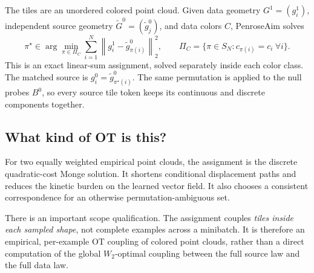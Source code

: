\documentclass[11pt]{article}
\newcommand{\1}{\mathbf{1}}
\begin{document}
The tiles are an unordered colored point cloud.  Given data geometry
\(G^1=(g_i^1)\), independent source geometry \(\widetilde G^0=(\tilde g_j^0)\),
and data colors \(C\), PenroseAim solves
\[
  \pi^\star\in
  \arg\min_{\pi\in\Pi_C}
  \sum_{i=1}^N
  \left\|g_i^1-\tilde g_{\pi(i)}^0\right\|_2^2,
  \qquad
  \Pi_C=\{\pi\in S_N:c_{\pi(i)}=c_i\ \forall i\}.
\]
This is an exact linear-sum assignment, solved separately inside each color
class.  The matched source is \(g_i^0=\tilde g_{\pi^\star(i)}^0\).  The same
permutation is applied to the null probes \(B^0\), so every source tile token
keeps its continuous and discrete components together.

\begin{center}
\end{center}

\subsection{What kind of OT is this?}

For two equally weighted empirical point clouds, the assignment is the
discrete quadratic-cost Monge solution.  It shortens conditional displacement
paths and reduces the kinetic burden on the learned vector field.  It also
chooses a consistent correspondence for an otherwise permutation-ambiguous
set.

There is an important scope qualification.  The assignment couples
\emph{tiles inside each sampled shape}, not complete examples across a
minibatch.  It is therefore an empirical, per-example OT coupling of colored
point clouds, rather than a direct computation of the global
\(W_2\)-optimal coupling between the full source law and the full data law.
\end{document}
